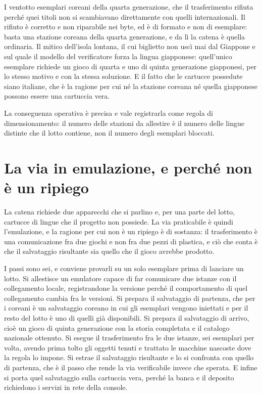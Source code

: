 I ventotto esemplari coreani della quarta generazione, che il trasferimento rifiuta perché quei titoli non si scambiavano direttamente con quelli internazionali. Il rifiuto è corretto e non riparabile nei byte, ed è di formato e non di esemplare: basta una stazione coreana della quarta generazione, e da lì la catena è quella ordinaria. Il mitico dell'isola lontana, il cui biglietto non uscì mai dal Giappone e sul quale il modello del verificatore forza la lingua giapponese: quell'unico esemplare richiede un gioco di quarta e uno di quinta generazione giapponesi, per lo stesso motivo e con la stessa soluzione. E il fatto che le cartucce possedute siano italiane, che è la ragione per cui né la stazione coreana né quella giapponese possono essere una cartuccia vera.

La conseguenza operativa è precisa e vale registrarla come regola di dimensionamento: il numero delle stazioni da allestire è il numero delle lingue distinte che il lotto contiene, non il numero degli esemplari bloccati.

\section{La via in emulazione, e perché non è un ripiego}

La catena richiede due apparecchi che si parlino e, per una parte del lotto, cartucce di lingue che il progetto non possiede. La via praticabile è quindi l'emulazione, e la ragione per cui non è un ripiego è di sostanza: il trasferimento è una comunicazione fra due giochi e non fra due pezzi di plastica, e ciò che conta è che il salvataggio risultante sia quello che il gioco avrebbe prodotto.

I passi sono sei, e conviene provarli su un solo esemplare prima di lanciare un lotto. Si allestisce un emulatore capace di far comunicare due istanze con il collegamento locale, registrandone la versione perché il comportamento di quel collegamento cambia fra le versioni. Si prepara il salvataggio di partenza, che per i coreani è un salvataggio coreano in cui gli esemplari vengono iniettati e per il resto del lotto è uno di quelli già disponibili. Si prepara il salvataggio di arrivo, cioè un gioco di quinta generazione con la storia completata e il catalogo nazionale ottenuto. Si esegue il trasferimento fra le due istanze, sei esemplari per volta, avendo prima tolto gli oggetti tenuti e trattato le macchine nascoste dove la regola lo impone. Si estrae il salvataggio risultante e lo si confronta con quello di partenza, che è il passo che rende la via verificabile invece che sperata. E infine si porta quel salvataggio sulla cartuccia vera, perché la banca e il deposito richiedono i servizi in rete della console.

